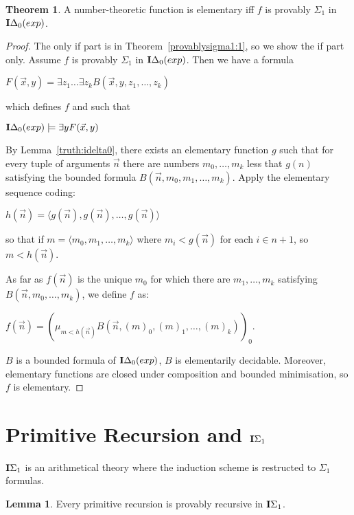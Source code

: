 \documentclass[8pt]{article}
\theoremstyle{definition}
\theoremstyle{definition}
\newtheorem{theorem}{Theorem}[section]
\theoremstyle{definition}
\theoremstyle{definition}
\theoremstyle{definition}
\theoremstyle{definition}
\theoremstyle{definition}
\theoremstyle{definition}
\newtheorem{lemma}{Lemma}[section]
\theoremstyle{definition}
\theoremstyle{definition}
\theoremstyle{definition}
\theoremstyle{definition}
\theoremstyle{definition}
\theoremstyle{question}
\begin{document}
\begin{theorem}
  A number-theoretic function is elementary iff $f$ is provably $\Sigma_1$ in ${\bf I}\Delta_0(exp)$.
\end{theorem}

\begin{proof}
  The only if part is in Theorem~\ref{provablysigma1:1}, so we show the if part only.
  Assume $f$ is provably $\Sigma_1$ in ${\bf I}\Delta_0(exp)$. Then we have a formula
  \begin{center}
    $F(\vec{x}, y) = \exists z_1 \dots \exists z_k B(\vec{x}, y, z_1, \dots, z_k)$
  \end{center}
  which defines $f$ and such that
  \begin{center}
  ${\bf I}\Delta_0(exp) \models \exists y F(\vec{x}, y)$
  \end{center}
  By Lemma~\ref{truth:idelta0}, there exists an elementary function $g$ such that for every
  tuple of arguments $\vec{n}$ there are numbers $m_0, \dots, m_k$
  less that $g(n)$ satisfying the bounded formula $B(\vec{n}, m_0, m_1, \dots, m_k)$.
  Apply the elementary sequence coding:
  \begin{center}
    $h(\vec{n}) = \langle g(\vec{n}), g(\vec{n}), \dots, g(\vec{n})\rangle$
  \end{center}
  so that if $m = \langle m_0, m_1, \dots, m_k \rangle$
  where $m_i < g(\vec{n})$ for each $i \in n + 1$, so $m < h(\vec{n})$.

  As far as $f(\vec{n})$ is the unique $m_0$ for which there are $m_1, \dots, m_k$ satisfying
  $B(\vec{n}, m_0, \dots, m_k)$, we define $f$ as:
  \begin{center}
    $f(\vec{n}) = (\mu_{m < h(\vec{n})} B(\vec{n}, (m)_0, (m)_1, \dots, (m)_k))_0$.
  \end{center}

  $B$ is a bounded formula of ${\bf I}\Delta_0(exp)$, $B$ is elementarily 
  decidable. Moreover, elementary functions are closed under composition and bounded minimisation,
  so $f$ is elementary.
\end{proof}

\section{Primitive Recursion and ${\bf I}\Sigma_1$}

${\bf I}\Sigma_1$ is an arithmetical theory where the induction scheme is
restructed to $\Sigma_1$ formulas.

\begin{lemma}
  Every primitive recursion is provably recursive in ${\bf I}\Sigma_1$.
\end{lemma}
\end{document}
